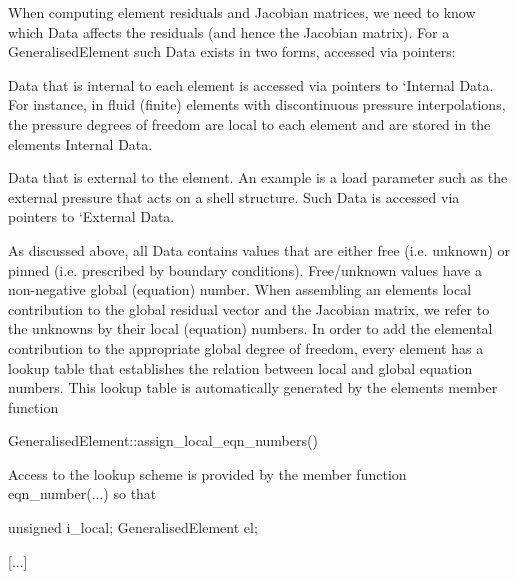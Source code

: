 \begin{DoxyItemize}
\item When computing element residuals and Jacobian matrices, we need to know which {\ttfamily Data} affects the residuals (and hence the Jacobian matrix). For a {\ttfamily Generalised\+Element} such {\ttfamily Data} exists in two forms, accessed via pointers\+:
\begin{DoxyItemize}
\item {\ttfamily Data} that is internal to each element is accessed via pointers to `\+Internal {\ttfamily Data\textquotesingle{}}. For instance, in fluid (finite) elements with discontinuous pressure interpolations, the pressure degrees of freedom are local to each element and are stored in the element\textquotesingle{}s \textquotesingle{}Internal {\ttfamily Data\textquotesingle{}}.
\item {\ttfamily Data} that is external to the element. An example is a load parameter such as the external pressure that acts on a shell structure. Such {\ttfamily Data} is accessed via pointers to `\+External {\ttfamily Data\textquotesingle{}}.
\item As discussed above, all {\ttfamily Data} contains values that are either free (i.\+e. unknown) or pinned (i.\+e. prescribed by boundary conditions). Free/unknown values have a non-\/negative global (equation) number. When assembling an element\textquotesingle{}s local contribution to the global residual vector and the Jacobian matrix, we refer to the unknowns by their local (equation) numbers. In order to add the elemental contribution to the appropriate global degree of freedom, every element has a lookup table that establishes the relation between local and global equation numbers. This lookup table is automatically generated by the element\textquotesingle{}s member function 
\begin{DoxyCode}
GeneralisedElement::assign\_local\_eqn\_numbers() 
\end{DoxyCode}
 Access to the lookup scheme is provided by the member function {\ttfamily eqn\+\_\+number}(...) so that 
\begin{DoxyCode}
\textcolor{keywordtype}{unsigned} i\_local;
GeneralisedElement el;

[...]


\end{DoxyCode}
\end{DoxyItemize}
\end{DoxyItemize}
